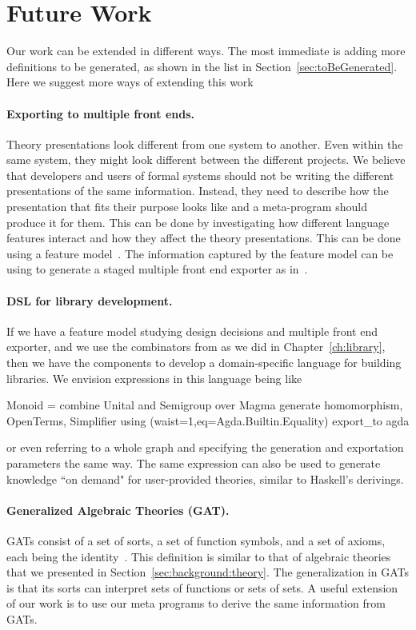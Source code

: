 \section{Future Work}
\label{future_work}
Our work can be extended in different ways. The most immediate is adding more definitions to be generated, as shown in the list in Section~\ref{sec:toBeGenerated}. Here we suggest more ways of extending this work 

\paragraph{Exporting to multiple front ends.} Theory presentations look different from one system to another. Even within the same system, they might look different between the different projects. We believe that developers and users of formal systems should not be writing the different presentations of the same information. Instead, they need to describe how the presentation that fits their purpose looks like and a meta-program should produce it for them. This can be done by investigating how different language features interact and how they affect the theory presentations. This can be done using a feature model~\cite{czarnecki2000generative}. The information captured by the feature model can be using to generate a staged multiple front end exporter as in~\cite{stagedConfig}. 

\paragraph{DSL for library development.}
If we have a feature model studying design decisions and multiple front end exporter, and we use the combinators from \cite{carette2018building} as we did in Chapter~\ref{ch:library}, then we have the components to develop a domain-specific language for building libraries. We envision expressions in this language being like
\begin{togcode}
Monoid = combine Unital and Semigroup over Magma
         generate homomorphism, OpenTerms, Simplifier
         using (waist=1,eq=Agda.Builtin.Equality)
         export_to agda 
\end{togcode} 
\noindent or even referring to a whole graph and specifying the generation and exportation parameters the same way. 
The same expression can also be used to generate knowledge ``on demand" for user-provided theories, similar to Haskell's derivings. 

\paragraph{Generalized Algebraic Theories (GAT).}
GATs consist of a set of sorts, a set of function symbols, and a set of axioms, each being the identity~\cite{cartmell1986gats}. This definition is similar to that of algebraic theories that we presented in Section~\ref{sec:background:theory}. The generalization in GATs is that its sorts can interpret sets of functions or sets of sets. A useful extension of our work is to use our meta programs to derive the same information from GATs. 
